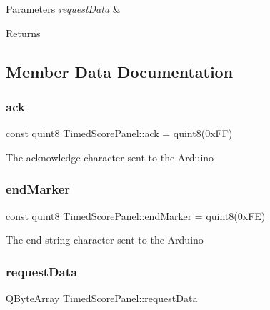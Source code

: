 \begin{DoxyParams}{Parameters}
{\em request\+Data} & \\
\hline
\end{DoxyParams}
\begin{DoxyReturn}{Returns}

\end{DoxyReturn}


\subsection{Member Data Documentation}
\mbox{\label{classTimedScorePanel_a58f99170c990833d0fd52e33015a1da1}} 
\subsubsection{\texorpdfstring{ack}{ack}}
{\footnotesize\ttfamily const quint8 Timed\+Score\+Panel\+::ack = quint8(0x\+F\+F)\hspace{0.3cm}{\ttfamily [protected]}}

The acknowledge character sent to the Arduino \mbox{\label{classTimedScorePanel_a1233e5ee97ca72e98b37c5fc81a2a94d}} 
\subsubsection{\texorpdfstring{end\+Marker}{endMarker}}
{\footnotesize\ttfamily const quint8 Timed\+Score\+Panel\+::end\+Marker = quint8(0x\+F\+E)\hspace{0.3cm}{\ttfamily [protected]}}

The end string character sent to the Arduino \mbox{\label{classTimedScorePanel_ab709153aa0a1ea23d2209c359b3adfe0}} 
\subsubsection{\texorpdfstring{request\+Data}{requestData}}
{\footnotesize\ttfamily Q\+Byte\+Array Timed\+Score\+Panel\+::request\+Data\hspace{0.3cm}{\ttfamily [protected]}}

